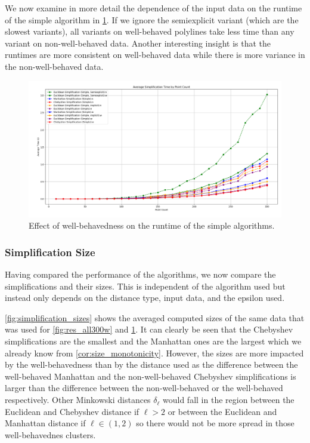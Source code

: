 We now examine in more detail the dependence of the input data on the runtime of the simple algorithm in \cref{fig:res_simple}. If we ignore the semiexplicit variant (which are the slowest variants), all variants on well-behaved polylines take less time than any variant on non-well-behaved data. Another interesting insight is that the runtimes are more consistent on well-behaved data while there is more variance in the non-well-behaved data. 

\begin{figure}[b]
  \centering
	\includegraphics[scale=0.4]{./figures/res_simple.png}
  \caption{Effect of well-behavedness on the runtime of the simple algorithms.}
  \label{fig:res_simple}
\end{figure}

\subsubsection{Simplification Size}
Having compared the performance of the algorithms, we now compare the simplifications and their sizes. This is independent of the algorithm used but instead only depends on the distance type, input data, and the epsilon used.

\cref{fig:simplification_sizes} shows the averaged computed sizes of the same data that was used for \cref{fig:res_all300w} and \cref{fig:res_simple}. It can clearly be seen that the Chebyshev simplifications are the smallest and the Manhattan ones are the largest which we already know from \cref{cor:size_monotonicity}. However, the sizes are more impacted by the well-behavedness than by the distance used as the difference between the well-behaved Manhattan and the non-well-behaved Chebyshev simplifications is larger than the difference between the non-well-behaved or the well-behaved respectively. Other Minkowski distances \(\delta_\ell\) would fall in the region between the Euclidean and Chebyshev distance if \(\ell > 2\) or between the Euclidean and Manhattan distance if \(\ell \in (1,2)\) so there would not be more spread in those well-behavednes clusters.

